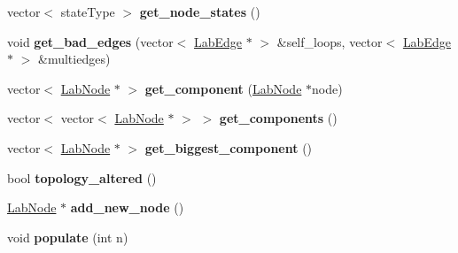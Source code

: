 \begin{DoxyCompactItemize}
\item 
\hypertarget{classelps_1_1_lab_network_af5c862cf17f8f43c3ca8f05d74d87b7b}{vector$<$ state\+Type $>$ {\bfseries get\+\_\+node\+\_\+states} ()}\label{classelps_1_1_lab_network_af5c862cf17f8f43c3ca8f05d74d87b7b}

\item 
\hypertarget{classelps_1_1_lab_network_a9251045c479f9b875d6f2f31c5aa8547}{void {\bfseries get\+\_\+bad\+\_\+edges} (vector$<$ \hyperlink{classelps_1_1_lab_edge}{Lab\+Edge} $\ast$ $>$ \&self\+\_\+loops, vector$<$ \hyperlink{classelps_1_1_lab_edge}{Lab\+Edge} $\ast$ $>$ \&multiedges)}\label{classelps_1_1_lab_network_a9251045c479f9b875d6f2f31c5aa8547}

\item 
\hypertarget{classelps_1_1_lab_network_ac79ded8681bf28c47e6cf96cd63e99e8}{vector$<$ \hyperlink{classelps_1_1_lab_node}{Lab\+Node} $\ast$ $>$ {\bfseries get\+\_\+component} (\hyperlink{classelps_1_1_lab_node}{Lab\+Node} $\ast$node)}\label{classelps_1_1_lab_network_ac79ded8681bf28c47e6cf96cd63e99e8}

\item 
\hypertarget{classelps_1_1_lab_network_ac4a41e6f41e95d073a42cab3a357d030}{vector$<$ vector$<$ \hyperlink{classelps_1_1_lab_node}{Lab\+Node} $\ast$ $>$ $>$ {\bfseries get\+\_\+components} ()}\label{classelps_1_1_lab_network_ac4a41e6f41e95d073a42cab3a357d030}

\item 
\hypertarget{classelps_1_1_lab_network_a72ded20fa3d56291345f5ac2f39b36b5}{vector$<$ \hyperlink{classelps_1_1_lab_node}{Lab\+Node} $\ast$ $>$ {\bfseries get\+\_\+biggest\+\_\+component} ()}\label{classelps_1_1_lab_network_a72ded20fa3d56291345f5ac2f39b36b5}

\item 
\hypertarget{classelps_1_1_lab_network_ac5b367d91c20a12d04785c761af5ddfe}{bool {\bfseries topology\+\_\+altered} ()}\label{classelps_1_1_lab_network_ac5b367d91c20a12d04785c761af5ddfe}

\item 
\hypertarget{classelps_1_1_lab_network_ae139a0189795b1aac81603e6f0c77552}{\hyperlink{classelps_1_1_lab_node}{Lab\+Node} $\ast$ {\bfseries add\+\_\+new\+\_\+node} ()}\label{classelps_1_1_lab_network_ae139a0189795b1aac81603e6f0c77552}

\item 
\hypertarget{classelps_1_1_lab_network_abfcc00d0a03112965c3ba30e3242d0de}{void {\bfseries populate} (int n)}\label{classelps_1_1_lab_network_abfcc00d0a03112965c3ba30e3242d0de}


\end{DoxyCompactItemize}
